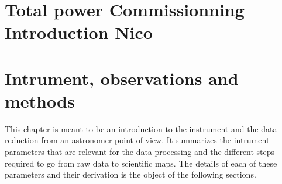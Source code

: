 \documentclass[a4paper, 11pt]{report}
\begin{document}
\newpage
%
%



\chapter{Total power Commissionning Introduction {\color{blue} Nico}}
\label{se:intro}


\clearpage
\chapter{Intrument, observations and methods}
\label{se:chap_instru_obs_methods}

This chapter is meant to be an introduction to the instrument and the data
reduction from an astronomer point of view. It summarizes the intrument
parameters that are relevant for the data processing and the different steps
required to go from raw data to scientific maps. The details of each of these
parameters and their derivation is the object of the following sections.








\end{document}
